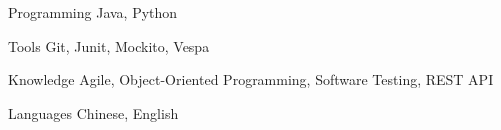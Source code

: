 

\begin{cvskills}

  \cvskill
    {Programming} %
    {Java, Python} %

  \cvskill
    {Tools} %
    {Git, Junit, Mockito, Vespa} %

  \cvskill
    {Knowledge} %
    {Agile, Object-Oriented Programming, Software Testing, REST API} %

  \cvskill
    {Languages} %
    {Chinese, English} %

\end{cvskills}
